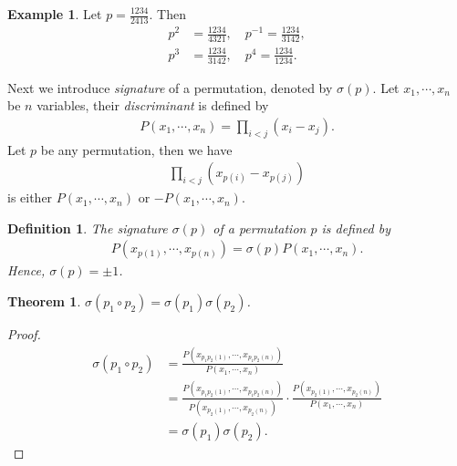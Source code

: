\documentclass[11pt]{book}
\newtheorem{definition}{Definition}[chapter]
\newtheorem{theorem}{Theorem}[chapter]
\theoremstyle{definition}
\newtheorem{example}{Example}[chapter]
\numberwithin{equation}{chapter}
\begin{document}
\medskip

\begin{example}
Let $p = \frac{1234}{2413}$. Then
\begin{align*}
    p^2 & = \frac{1234}{4321},\quad p^{-1} = \frac{1234}{3142}, \\
    p^3 & = \frac{1234}{3142},\quad p^{4} = \frac{1234}{1234}.
\end{align*}
\end{example}

\medskip

Next we introduce \emph{signature} of a permutation, denoted by $\sigma(p)$. Let $x_1,\cdots,x_n$ be $n$ variables, their \emph{discriminant} is defined by 
\begin{align*}
    P(x_1,\cdots,x_n) = \prod_{i < j}(x_i - x_j).
\end{align*}
Let $p$ be any permutation, then we have 
\begin{align*}
    \prod_{i < j}\left(x_{p(i)} - x_{p(j)} \right)
\end{align*}
is either $P(x_1,\cdots,x_n)$ or $- P(x_1,\cdots,x_n)$.

\medskip

\begin{definition}
The signature $\sigma(p)$  of a permutation $p$ is defined by
\begin{align*}
    P\left(x_{p(1)},\cdots,x_{p(n)}\right) = \sigma(p) P(x_1,\cdots,x_n).
\end{align*}
Hence, $\sigma(p) = \pm 1$.
\end{definition}

\medskip

\begin{theorem}
$\sigma(p_1\circ p_2) = \sigma(p_1) \sigma(p_2)$.
\end{theorem}
\begin{proof}
\begin{align*}
    \sigma(p_1\circ p_2) & = \frac{P\left(x_{p_1p_2(1)},\cdots,x_{p_1p_2(n)}\right)}{P(x_1,\cdots,x_n)} \\
    & = \frac{P\left(x_{p_1p_2(1)},\cdots,x_{p_1p_2(n)}\right)}{P(x_{p_2(1)},\cdots,x_{p_2(n)})}\cdot \frac{P\left(x_{p_2(1)},\cdots,x_{p_2(n)}\right)}{P(x_1,\cdots,x_n)}\\
    & = \sigma(p_1) \sigma(p_2).
\end{align*}
\end{proof}

\medskip
\end{document}
